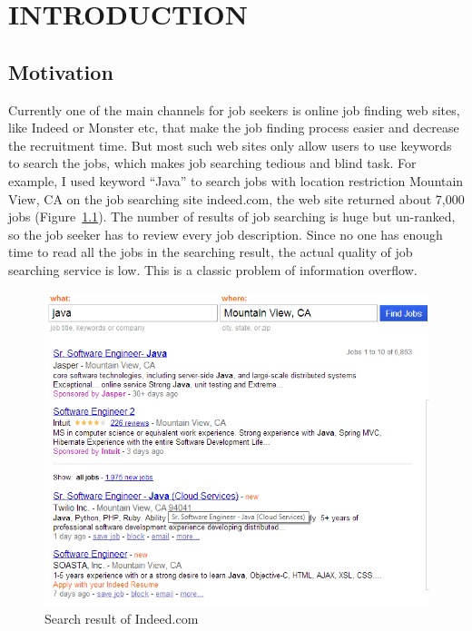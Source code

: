\chapter{INTRODUCTION}




\section{Motivation}
Currently one of the main channels for job seekers is online job finding web sites, like Indeed or  Monster etc, that make the job finding process easier and decrease the recruitment time. But most such web sites only allow users to use keywords to search the jobs, which makes job searching tedious and blind task. For example, I used keyword ``Java'' to search jobs with location restriction Mountain View, CA on the job searching site indeed.com, the web site returned about 7,000 jobs (Figure~\ref{fig:Indeed}). The number of results of job searching is huge but un-ranked, so the job seeker has to review every job description. Since no one has enough time to read all the jobs in the searching result, the actual quality of job searching service is low. This is a classic problem of information overflow.


\begin{figure}[htbp]
  \centering
  \includegraphics[scale=0.6]{images/indeed1.png}
  \caption{Search result of Indeed.com}
  \label{fig:Indeed}
\end{figure}

